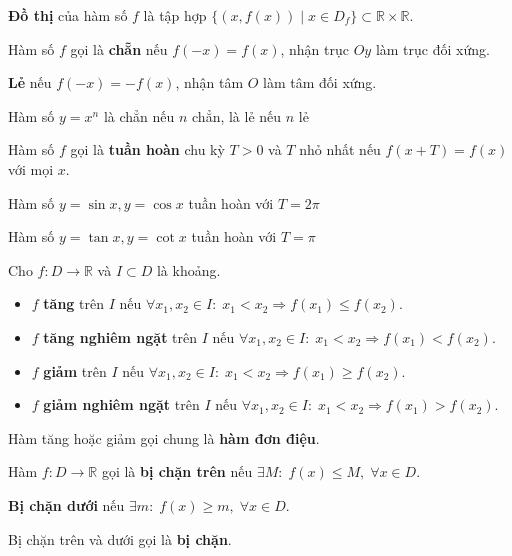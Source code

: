 \documentclass[12pt,a4paper]{article}
\begin{document}
\begin{dinhnghia}[title={Đồ thị hàm số}]
  \textbf{Đồ thị} của hàm số $f$ là tập hợp $\bigl\{(x, f(x)) \mid x \in D_f\bigr\} \subset \mathbb{R} \times \mathbb{R}$.
\end{dinhnghia}

\begin{dinhnghia}
  Hàm số $f$ gọi là \textbf{chẵn} nếu $f(-x) = f(x)$, nhận trục $Oy$ làm trục đối xứng.
  
  \textbf{Lẻ} nếu $f(-x) = -f(x)$, nhận tâm $O$ làm tâm đối xứng.
\end{dinhnghia}

\begin{vidu}
    Hàm số $y = x^n$ là chẳn nếu $n$ chẳn, là lẻ nếu $n$ lẻ
\end{vidu}

\begin{dinhnghia}
  Hàm số $f$ gọi là \textbf{tuần hoàn} chu kỳ $T > 0$ và $T$ nhỏ nhất nếu $f(x + T) = f(x)$ với mọi $x$.
\end{dinhnghia}

\begin{vidu}
    Hàm số $y = \sin x, y = \cos x$ tuần hoàn với $T = 2\pi$

    Hàm số $y = \tan x, y = \cot x$ tuần hoàn với $T = \pi$
\end{vidu}

\begin{dinhnghia}[title={Hàm số đơn điệu}]
  Cho $f: D \to \mathbb{R}$ và $I \subset D$ là khoảng.
  \begin{itemize}
    \item $f$ \textbf{tăng} trên $I$ nếu $\forall x_1, x_2 \in I:\; x_1 < x_2 \Rightarrow f(x_1) \le f(x_2)$.
    \item $f$ \textbf{tăng nghiêm ngặt} trên $I$ nếu $\forall x_1, x_2 \in I:\; x_1 < x_2 \Rightarrow f(x_1) < f(x_2)$.
    \item $f$ \textbf{giảm} trên $I$ nếu $\forall x_1, x_2 \in I:\; x_1 < x_2 \Rightarrow f(x_1) \ge f(x_2)$.
    \item $f$ \textbf{giảm nghiêm ngặt} trên $I$ nếu $\forall x_1, x_2 \in I:\; x_1 < x_2 \Rightarrow f(x_1) > f(x_2)$.
  \end{itemize}
  Hàm tăng hoặc giảm gọi chung là \textbf{hàm đơn điệu}.
\end{dinhnghia}

\begin{dinhnghia}[title={Hàm số bị chặn}]
  Hàm $f: D \to \mathbb{R}$ gọi là \textbf{bị chặn trên} nếu $\exists M:\; f(x) \le M,\; \forall x \in D$. 
  
  \textbf{Bị chặn dưới} nếu $\exists m:\; f(x) \ge m,\; \forall x \in D$.
  
  Bị chặn trên và dưới gọi là \textbf{bị chặn}.
\end{dinhnghia}
\end{document}

